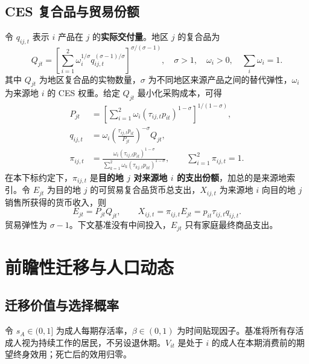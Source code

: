 \documentclass[UTF8,a4paper,zihao=-4,fontset=windows]{ctexart}
\numberwithin{equation}{section}
\begin{document}
\subsection{CES 复合品与贸易份额}
令 $q_{ij,t}$ 表示 $i$ 产品在 $j$ 的\textbf{实际交付量}。地区 $j$ 的复合品为
\begin{equation}
  Q_{jt}=\left[\sum_{i=1}^2\omega_i^{1/\sigma}
       q_{ij,t}^{(\sigma-1)/\sigma}\right]^{\sigma/(\sigma-1)},
  \quad \sigma>1,\quad \omega_i>0,\quad\sum_i\omega_i=1.
  \label{eq:ces}
\end{equation}
其中 $Q_{jt}$ 为地区复合品的实物数量，$\sigma$ 为不同地区来源产品之间的替代弹性，$\omega_i$ 为来源地 $i$ 的 CES 权重。给定 $Q_{jt}$ 最小化采购成本，可得
\begin{align}
  P_{jt}&=\left[\sum_{i=1}^2\omega_i
           (\tau_{ij,t}p_{it})^{1-\sigma}\right]^{1/(1-\sigma)},
           \label{eq:price-index}\\
  q_{ij,t}&=\omega_i\left(\frac{\tau_{ij,t}p_{it}}{P_{jt}}\right)^{-\sigma}Q_{jt},
           \label{eq:bilateral-quantity}\\
  \pi_{ij,t}&=\frac{\omega_i(\tau_{ij,t}p_{it})^{1-\sigma}}
       {\sum_{k=1}^2\omega_k(\tau_{kj,t}p_{kt})^{1-\sigma}},
  \qquad\sum_{i=1}^2\pi_{ij,t}=1.
  \label{eq:trade-share}
\end{align}
在本下标约定下，$\pi_{ij,t}$ 是\textbf{目的地 $j$ 对来源地 $i$ 的支出份额}，加总的是来源地索引。令 $E_{jt}$ 为目的地 $j$ 的可贸易复合品货币总支出，$X_{ij,t}$ 为来源地 $i$ 向目的地 $j$ 销售所获得的货币收入，则
\begin{equation}
  E_{jt}=P_{jt}Q_{jt},\qquad
  X_{ij,t}=\pi_{ij,t}E_{jt}=p_{it}\tau_{ij,t}q_{ij,t}.
  \label{eq:trade-values}
\end{equation}
贸易弹性为 $\sigma-1$。下文基准没有中间投入，$E_{jt}$ 只有家庭最终商品支出。

\section{前瞻性迁移与人口动态}
\label{sec:migration-demography}

\subsection{迁移价值与选择概率}
令 $s_A\in(0,1]$ 为成人每期存活率，$\beta\in(0,1)$ 为时间贴现因子。基准将所有存活成人视为持续工作的居民，不另设退休期。$V_{it}$ 是处于 $i$ 的成人在本期消费前的期望终身效用；死亡后的效用归零。
\end{document}
